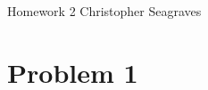 \documentclass{article}
\begin{document}
    \raggedright
    Homework 2 \break
    Christopher Seagraves

    \section*{Problem 1}
\end{document}
